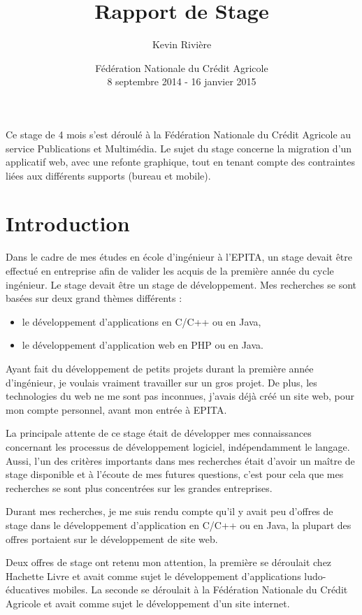 \documentclass[12pt,a4paper]{article}
\author{Kevin Rivière}
\title{Rapport de Stage}
\date{Fédération Nationale du Crédit Agricole\\ 8 septembre 2014 - 16 janvier 2015}
\begin{document}
\maketitle
Ce stage de 4 mois s'est déroulé à la Fédération Nationale du Crédit Agricole au service Publications et Multimédia. Le sujet du stage concerne la migration d'un applicatif web, avec une refonte graphique, tout en tenant compte des contraintes liées aux différents supports (bureau et mobile).
\thispagestyle{empty}
\setcounter{page}{0}
\newpage

\tableofcontents
\thispagestyle{empty}
\setcounter{page}{0}
\newpage
\setcounter{page}{1}
\section{Introduction}
Dans le cadre de mes études en école d'ingénieur à l'EPITA, un stage devait être effectué en entreprise afin de valider les acquis de la première année du cycle ingénieur. Le stage devait être un stage de développement. Mes recherches se sont basées sur deux grand thèmes différents : 
\begin{itemize}
\item le développement d'applications en C/C++ ou en Java,
\item le développement d'application web en \gls{PHP} ou en Java.
\end{itemize}\par
Ayant fait du développement de petits projets durant la première année d'ingénieur, je voulais vraiment travailler sur un gros projet. De plus, les technologies du web ne me sont pas inconnues, j'avais déjà créé un site web, pour mon compte personnel, avant mon entrée à EPITA.\par 
\medskip
La principale attente de ce stage était de développer mes connaissances concernant les processus de développement logiciel, indépendamment le langage. Aussi, l'un des critères importants dans mes recherches était d'avoir un maître de stage disponible et à l'écoute de mes futures questions, c'est pour cela que mes recherches se sont plus concentrées sur les grandes entreprises.\par
Durant mes recherches, je me suis rendu compte qu'il y avait peu d'offres de stage dans le développement d'application en C/C++ ou en Java, la plupart des offres portaient sur le développement de site web. \par 
\medskip
Deux offres de stage ont retenu mon attention, la première se déroulait chez Hachette Livre et avait comme sujet le développement d'applications ludo-éducatives mobiles. La seconde se déroulait à la Fédération Nationale du Crédit Agricole et avait comme sujet le développement d'un site internet.\par 
\end{document}
